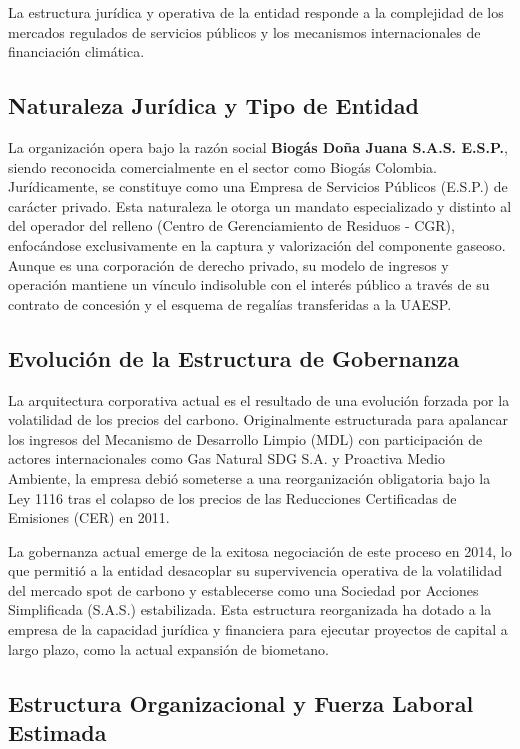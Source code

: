 \documentclass[11pt,letterpaper]{article}
\begin{document}
La estructura jurídica y operativa de la entidad responde a la complejidad de
los mercados regulados de servicios públicos y los mecanismos internacionales de
financiación climática.

\subsection{Naturaleza Jurídica y Tipo de Entidad}

La organización opera bajo la razón social \textbf{Biogás Doña Juana S.A.S.
E.S.P.}, siendo reconocida comercialmente en el sector como Biogás Colombia.
Jurídicamente, se constituye como una Empresa de Servicios Públicos (E.S.P.) de
carácter privado. Esta naturaleza le otorga un mandato especializado y distinto
al del operador del relleno (Centro de Gerenciamiento de Residuos - CGR),
enfocándose exclusivamente en la captura y valorización del componente gaseoso.
Aunque es una corporación de derecho privado, su modelo de ingresos y operación
mantiene un vínculo indisoluble con el interés público a través de su contrato
de concesión y el esquema de regalías transferidas a la UAESP.

\subsection{Evolución de la Estructura de Gobernanza}

La arquitectura corporativa actual es el resultado de una evolución forzada por
la volatilidad de los precios del carbono. Originalmente estructurada para
apalancar los ingresos del Mecanismo de Desarrollo Limpio (MDL) con
participación de actores internacionales como Gas Natural SDG S.A. y Proactiva
Medio Ambiente, la empresa debió someterse a una reorganización obligatoria bajo
la Ley 1116 tras el colapso de los precios de las Reducciones Certificadas de
Emisiones (CER) en 2011.

La gobernanza actual emerge de la exitosa negociación de este proceso en 2014,
lo que permitió a la entidad desacoplar su supervivencia operativa de la
volatilidad del mercado spot de carbono y establecerse como una Sociedad por
Acciones Simplificada (S.A.S.) estabilizada. Esta estructura reorganizada ha
dotado a la empresa de la capacidad jurídica y financiera para ejecutar
proyectos de capital a largo plazo, como la actual expansión de biometano.

\subsection{Estructura Organizacional y Fuerza Laboral Estimada}
\end{document}
